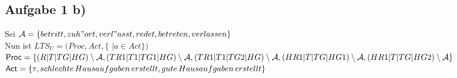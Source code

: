 \subsection*{Aufgabe 1 b)}
Sei $\mathcal{A} = \{betritt, zuh"ort, verl"asst, redet, betreten, verlassen\}$\\

Nun ist $LTS_U = (Proc, Act, \{ $  $ | a \in Act \})$\\

$\mbox{\sf Proc} = \{ (R | T | TG | HG) \setminus \mathcal{A}, \\
(TR1 | T1 | TG1 | HG) \setminus \mathcal{A}, \\
(TR1 | T1 | TG2 | HG) \setminus \mathcal{A}, \\
(HR1 | T | TG | HG1) \setminus \mathcal{A}, \\
(HR1 | T | TG | HG2)  \setminus \mathcal{A} \}$ \\

$\mbox{\sf Act} = \lbrace \tau , schlechte\,Hausaufgaben\,erstellt, gute\,Hausaufgaben\,erstellt \rbrace$ \\

